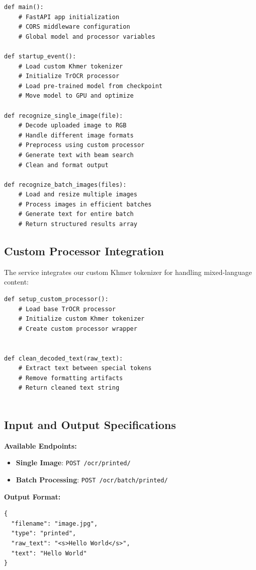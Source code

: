 {\begin{verbatim}
def main():
    # FastAPI app initialization
    # CORS middleware configuration
    # Global model and processor variables

def startup_event():
    # Load custom Khmer tokenizer
    # Initialize TrOCR processor
    # Load pre-trained model from checkpoint
    # Move model to GPU and optimize

def recognize_single_image(file):
    # Decode uploaded image to RGB
    # Handle different image formats
    # Preprocess using custom processor
    # Generate text with beam search
    # Clean and format output

def recognize_batch_images(files):
    # Load and resize multiple images
    # Process images in efficient batches
    # Generate text for entire batch
    # Return structured results array

\end{verbatim}

\subsection{Custom Processor Integration}
\label{subsec:custom-processor}

The service integrates our custom Khmer tokenizer for handling mixed-language content:

\begin{verbatim}
def setup_custom_processor():
    # Load base TrOCR processor
    # Initialize custom Khmer tokenizer
    # Create custom processor wrapper


def clean_decoded_text(raw_text):
    # Extract text between special tokens
    # Remove formatting artifacts
    # Return cleaned text string
    
\end{verbatim}

\subsection{Input and Output Specifications}
\label{subsec:trocr-io}

\textbf{Available Endpoints:}
\begin{itemize}
\item \textbf{Single Image}: \texttt{POST /ocr/printed/}
\item \textbf{Batch Processing}: \texttt{POST /ocr/batch/printed/}
\end{itemize}

\textbf{Output Format:}
\begin{verbatim}
{
  "filename": "image.jpg",
  "type": "printed",
  "raw_text": "<s>Hello World</s>",
  "text": "Hello World"
}
\end{verbatim}

}
